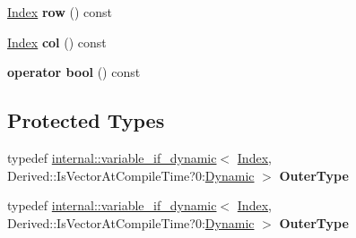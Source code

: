 \begin{DoxyCompactItemize}
\hyperlink{group___core___module_a554f30542cc2316add4b1ea0a492ff02}{Index} {\bfseries row} () const
\item 
\mbox{\label{class_eigen_1_1_sparse_compressed_base_1_1_reverse_inner_iterator_ade4a4aa44689b252b291b2b16069c26a}} 
\hyperlink{group___core___module_a554f30542cc2316add4b1ea0a492ff02}{Index} {\bfseries col} () const
\item 
\mbox{\label{class_eigen_1_1_sparse_compressed_base_1_1_reverse_inner_iterator_a7fb357bb06ecf360b1964f5325fb52b7}} 
{\bfseries operator bool} () const
\end{DoxyCompactItemize}
\subsection*{Protected Types}
\begin{DoxyCompactItemize}
\item 
\mbox{\label{class_eigen_1_1_sparse_compressed_base_1_1_reverse_inner_iterator_a1a0ea3e7c5ad921e4d3de265e990ae90}} 
typedef \hyperlink{class_eigen_1_1internal_1_1variable__if__dynamic}{internal\+::variable\+\_\+if\+\_\+dynamic}$<$ \hyperlink{group___core___module_a554f30542cc2316add4b1ea0a492ff02}{Index}, Derived\+::\+Is\+Vector\+At\+Compile\+Time?0\+:\hyperlink{namespace_eigen_ad81fa7195215a0ce30017dfac309f0b2}{Dynamic} $>$ {\bfseries Outer\+Type}
\item 
\mbox{\label{class_eigen_1_1_sparse_compressed_base_1_1_reverse_inner_iterator_a1a0ea3e7c5ad921e4d3de265e990ae90}} 
typedef \hyperlink{class_eigen_1_1internal_1_1variable__if__dynamic}{internal\+::variable\+\_\+if\+\_\+dynamic}$<$ \hyperlink{group___core___module_a554f30542cc2316add4b1ea0a492ff02}{Index}, Derived\+::\+Is\+Vector\+At\+Compile\+Time?0\+:\hyperlink{namespace_eigen_ad81fa7195215a0ce30017dfac309f0b2}{Dynamic} $>$ {\bfseries Outer\+Type}
\end{DoxyCompactItemize}
